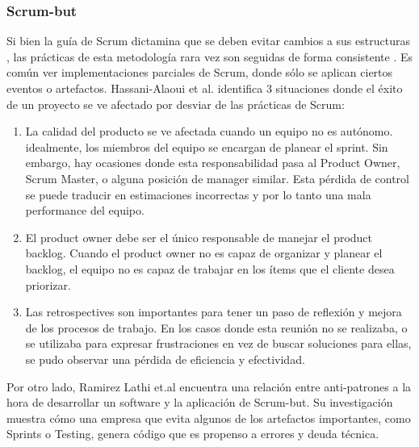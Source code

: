 \subsubsection{Scrum-but}
\par Si bien la guía de Scrum dictamina que se deben evitar cambios a sus estructuras \cite{schwaberScrumGuide2020}, las prácticas de esta metodología rara vez son seguidas de forma consistente \cite{HawaiiInternationalConference2020}. Es común ver implementaciones parciales de Scrum, donde sólo se aplican ciertos eventos o artefactos.
Hassani-Alaoui et al. \cite{HawaiiInternationalConference2020} identifica 3 situaciones donde el éxito de un proyecto se ve afectado por desviar de las prácticas de Scrum:
\begin{enumerate}
    \item La calidad del producto se ve afectada cuando un equipo no es autónomo. idealmente, los miembros del equipo se encargan de planear el sprint. Sin embargo, hay ocasiones donde esta responsabilidad pasa al Product Owner, Scrum Master, o alguna posición de manager similar. Esta pérdida de control se puede traducir en estimaciones incorrectas y por lo tanto una mala performance del equipo.
    \item El product owner debe ser el único responsable de manejar el product backlog. Cuando el product owner no es capaz de organizar y planear el backlog, el equipo no es capaz de trabajar en los ítems que el cliente desea priorizar.
    \item Las retrospectives son importantes para tener un paso de reflexión y mejora de los procesos de trabajo. En los casos donde esta reunión no se realizaba, o se utilizaba para expresar frustraciones en vez de buscar soluciones para ellas, se pudo observar una pérdida de eficiencia y efectividad.
\end{enumerate}
\par Por otro lado, Ramirez Lathi et.al \cite{lahtiScrumButIndicatorProcess2022} encuentra una relación entre anti-patrones a la hora de desarrollar un software y la aplicación de Scrum-but. Su investigación muestra cómo una empresa que evita algunos de los artefactos importantes, como Sprints o Testing, genera código que es propenso a errores y deuda técnica.
